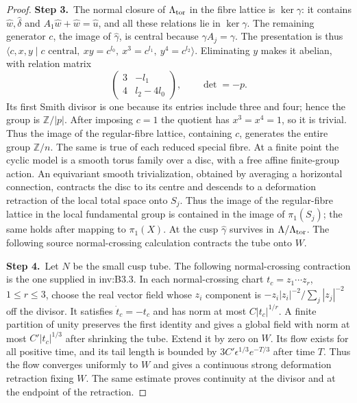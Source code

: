 \begin{proof}
\par\smallskip\noindent\textbf{Step 3.}\ The normal closure of $\Lambda_{\rm tor}$ in the fibre lattice is
$\ker\gamma$: it contains $\hat w,\hat\delta$ and
$A_1\hat w+\hat w=\hat u$, and all these relations lie in
$\ker\gamma$. The remaining generator $c$, the image of
$\hat\gamma$, is central because $\gamma A_j=\gamma$.
The presentation is thus
$\langle c,x,y\mid c\text{ central},\ xy=c^{l_0},\
x^3=c^{l_1},\ y^4=c^{l_2}\rangle$.
Eliminating $y$ makes it abelian, with relation matrix
\[
 \begin{pmatrix}3&-l_1\\4&l_2-4l_0\end{pmatrix},
 \qquad\det=-p.
\]
Its first Smith divisor is one because its entries include three
and four; hence the group is $\mathbb Z/|p|$.
After imposing $c=1$ the quotient has $x^3=x^4=1$, so it is trivial.
Thus the image of the regular-fibre lattice, containing $c$, generates
the entire group $\mathbb Z/n$. The same is true of each reduced special
fibre. At a finite point the cyclic model is a smooth torus family
over a disc, with a free affine finite-group action. An equivariant
smooth trivialization, obtained by averaging a horizontal connection,
contracts the disc to its centre and descends to a deformation
retraction of the local total space onto $S_j$. Thus the image of
the regular-fibre lattice in the local fundamental group is contained
in the image of $\pi_1(S_j)$; the same holds after mapping to
$\pi_1(X)$. At the cusp $\hat\gamma$ survives in
$\Lambda/\Lambda_{\rm tor}$. The following source normal-crossing calculation contracts the tube onto $W$.

\par\smallskip\noindent\textbf{Step 4.}\ Let $N$ be the small cusp tube. The following normal-crossing contraction is the one supplied in inv:B3.3. In each normal-crossing chart
$t_c=z_1\cdots z_r$, $1\le r\le3$, choose the real vector field
whose $z_i$ component is
$-z_i|z_i|^{-2}/\sum_j|z_j|^{-2}$ off the divisor.
It satisfies $\dot t_c=-t_c$ and has norm at most
$C|t_c|^{1/r}$. A finite partition of unity preserves the first
identity and gives a global field with norm at most
$C'|t_c|^{1/3}$ after shrinking the tube. Extend it by zero on $W$.
Its flow exists for all positive time, and its tail length is
bounded by $3C'\epsilon^{1/3}e^{-T/3}$ after time $T$.
Thus the flow converges uniformly to $W$ and gives a continuous
strong deformation retraction fixing $W$. The same estimate proves
continuity at the divisor and at the endpoint of the retraction.


\end{proof}
